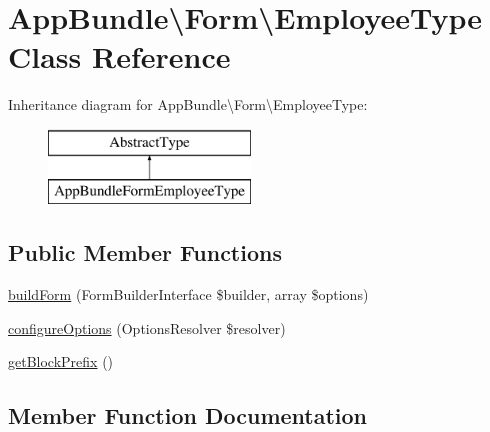 \hypertarget{class_app_bundle_1_1_form_1_1_employee_type}{}\section{App\+Bundle\textbackslash{}Form\textbackslash{}Employee\+Type Class Reference}
\label{class_app_bundle_1_1_form_1_1_employee_type}
Inheritance diagram for App\+Bundle\textbackslash{}Form\textbackslash{}Employee\+Type\+:\begin{figure}[H]
\begin{center}
\leavevmode
\includegraphics[height=2.000000cm]{class_app_bundle_1_1_form_1_1_employee_type}
\end{center}
\end{figure}
\subsection*{Public Member Functions}
\begin{DoxyCompactItemize}
\item 
\mbox{\hyperlink{class_app_bundle_1_1_form_1_1_employee_type_a040f771cf8a566d92f192a256fa2abe5}{build\+Form}} (Form\+Builder\+Interface \$builder, array \$options)
\item 
\mbox{\hyperlink{class_app_bundle_1_1_form_1_1_employee_type_a09552cba014fd6ff78910a1797099522}{configure\+Options}} (Options\+Resolver \$resolver)
\item 
\mbox{\hyperlink{class_app_bundle_1_1_form_1_1_employee_type_a4ebe090c2e4427b91372e9cdc6b935f0}{get\+Block\+Prefix}} ()
\end{DoxyCompactItemize}


\subsection{Member Function Documentation}
\mbox{\label{class_app_bundle_1_1_form_1_1_employee_type_a040f771cf8a566d92f192a256fa2abe5}} 
